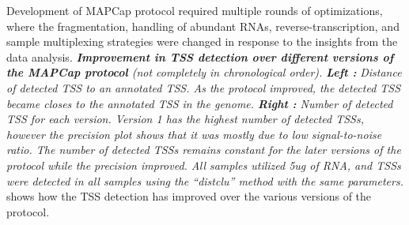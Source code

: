 \documentclass[11pt,twoside]{MPIthesis}
\theoremstyle{definition}
\theoremstyle{definition}
\theoremstyle{definition}
\theoremstyle{remark}
\begin{document}
Development of MAPCap protocol required multiple rounds of
optimizations, where the fragmentation, handling of abundant RNAs,
reverse-transcription, and sample multiplexing strategies were changed
in response to the insights from the data analysis. \emph{\textbf{Improvement in TSS detection over different
versions of the MAPCap protocol} (not completely in chronological
order). \textbf{Left :}} \emph{Distance} \emph{of detected TSS to an
annotated TSS. As the protocol improved, the detected TSS became closes
to the annotated TSS in the genome. \textbf{Right :} Number of detected
TSS for each version. Version 1 has the highest number of detected TSSs,
however the precision plot shows that it was mostly due to low
signal-to-noise ratio. The number of detected TSSs remains constant for
the later versions of the protocol while the precision improved. All
samples utilized 5ug of RNA, and TSSs were detected in all samples using
the ``distclu'' method with the same parameters. } shows
how the TSS detection has improved over the various versions of the
protocol.
\end{document}
